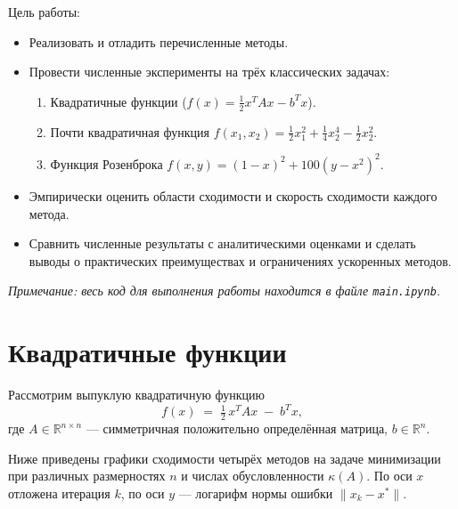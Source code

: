 \documentclass[a4paper]{article}
\begin{document}
Цель работы:
\begin{itemize}
    \item Реализовать и отладить перечисленные методы.
    \item Провести численные эксперименты на трёх классических задачах:
    \begin{enumerate}
        \item Квадратичные функции ($f(x)=\frac12 x^T A x - b^T x$).
        \item Почти квадратичная функция $f(x_1,x_2)=\frac12 x_1^2 + \frac14 x_2^4 - \frac12 x_2^2$.
        \item Функция Розенброка $f(x,y)=(1-x)^2 + 100(y-x^2)^2$.
    \end{enumerate}
    \item Эмпирически оценить области сходимости и скорость сходимости каждого метода.
    \item Сравнить численные результаты с аналитическими оценками и сделать выводы о практических преимуществах и ограничениях ускоренных методов.
\end{itemize}

\textit{Примечание: весь код для выполнения работы находится в файле \texttt{main.ipynb}.}

\section{Квадратичные функции}
Рассмотрим выпуклую квадратичную функцию
\[
f(x) \;=\; \tfrac12\,x^T A x \;-\; b^T x,
\]
где \(A \in \mathbb{R}^{n\times n}\) — симметричная положительно определённая матрица, \(b\in\mathbb{R}^n\).  

Ниже приведены графики сходимости четырёх методов на задаче минимизации при различных размерностях \(n\) и числах обусловленности \(\kappa(A)\).  
По оси \(x\) отложена итерация \(k\), по оси \(y\) — логарифм нормы ошибки \(\|x_k - x^*\|\).
\end{document}
